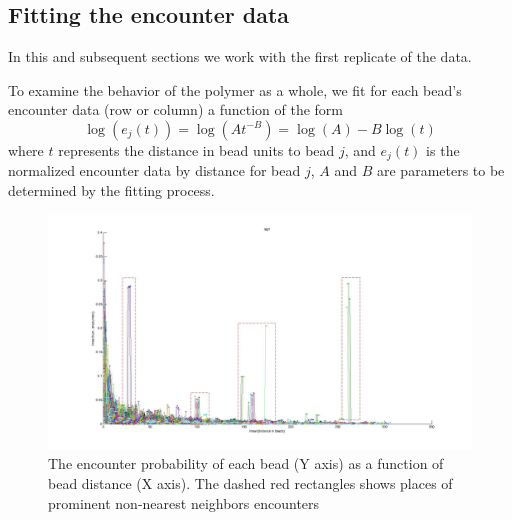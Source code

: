 \documentclass[12pt]{paper}
\begin{document}
\subsection{Fitting the encounter data}
In this and subsequent sections we work with the first replicate of the data.

To examine the behavior of the polymer as a whole, we fit for each bead's encounter data 
(row or column) a function of the form 
\begin{equation}\label{fitModel}
\log(e_j(t))= \log(At^{-B})= \log(A)-B\log(t)
\end{equation}
where $t$ represents the distance in bead units to bead $j$, and $e_j(t)$ is the normalized encounter data by distance for bead $j$, $A$ and $B$ are parameters to be determined by the fitting process. 

\begin{figure}[H]
\includegraphics*[scale=0.2]{EncounterFrequenciesByDistanceRep1}
\caption{\scriptsize{The encounter probability of each bead (Y axis) as a function of bead distance (X axis). The dashed red rectangles shows places of prominent non-nearest neighbors encounters}}
\end{figure}
\end{document}
